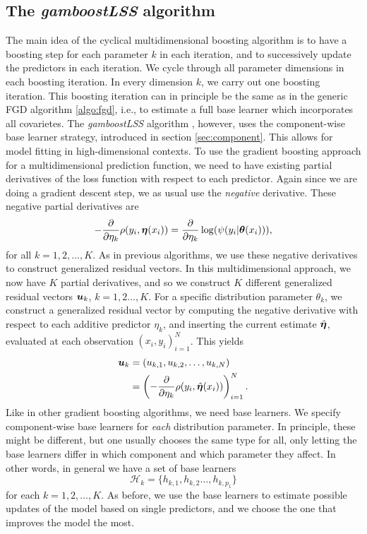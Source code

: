 \subsection{The \textit{gamboostLSS} algorithm}
The main idea of the cyclical multidimensional boosting algorithm is to have a boosting step for each parameter $k$ in each iteration, and to successively update the predictors in each iteration.
We cycle through all parameter dimensions in each boosting iteration.
In every dimension $k$, we carry out one boosting iteration.
This boosting iteration can in principle be the same as in the generic FGD algorithm \eqref{algo:fgd}, i.e., to estimate a full base learner which incorporates all covarietes.
The \textit{gamboostLSS} algorithm \citep{gamboostlss-paper}, however, uses the component-wise base learner strategy, introduced in section \ref{sec:component}.
This allows for model fitting in high-dimensional contexts.
To use the gradient boosting approach for a multidimensional prediction function, we need to have existing partial derivatives of the loss function with respect to each predictor.
Again since we are doing a gradient descent step, we as usual use the \textit{negative} derivative.
These negative partial derivatives are
\begin{equation*}
    -\frac{\partial}{\partial\eta_k}\rho(y_i,\boldsymbol{\eta}(x_i))=\frac{\partial}{\partial\eta_k}\log(\psi(y_i|\boldsymbol{\theta}(x_i))),
\end{equation*}
for all $k=1,2,\ldots,K$.
As in previous algorithms, we use these negative derivatives to construct generalized residual vectors.
In this multidimensional approach, we now have $K$ partial derivatives, and so we construct $K$ different generalized residual vectors $\bm{u}_k$, $k=1,2\ldots,K$.
For a specific distribution parameter $\theta_k$, we construct a generalized residual vector by computing the negative derivative with respect to each additive predictor $\eta_k$, and inserting the current estimate $\hat{\boldsymbol{\eta}}$, evaluated at each observation $(x_i,y_i)_{i=1}^N$.
This yields
\begin{align*}
    \bm{u}_k&=(u_{k,1},u_{k,2},\ldots,u_{k,N})\\
    &=\left(-\frac{\partial}{\partial \eta_k}\rho(y_i,\hat{\boldsymbol{\eta}}(x_i))\right)_{i=1}^N.
\end{align*}
Like in other gradient boosting algorithms, we need base learners.
We specify component-wise base learners for \textit{each} distribution parameter.
In principle, these might be different, but one usually chooses the same type for all, only letting the base learners differ in which component and which parameter they affect.
In other words, in general we have a set of base learners
\begin{equation*}
    \mathcal{H}_{k}=\{h_{k,1},h_{k,2}\ldots,h_{k,p_1}\}
\end{equation*}
for each $k=1,2,\ldots,K$.
As before, we use the base learners to estimate possible updates of the model based on single predictors, and we choose the one that improves the model the most.

